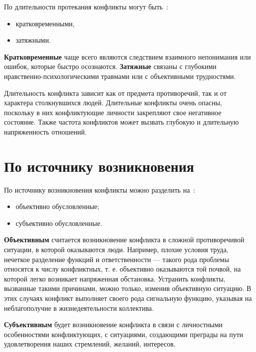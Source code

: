 По длительности протекания конфликты могут быть~\cite{book08}:
\begin{itemize}
    \item кратковременными,
    \item затяжными.
\end{itemize}

\textbf{Кратковременные} чаще всего являются следствием взаимного непонимания или ошибок,
которые быстро осознаются. \textbf{Затяжные} связаны с глубокими
нравственно-психологическими травмами или с объективными трудностями.

Длительность конфликта зависит как от предмета противоречий, так и от характера
столкнувшихся людей. Длительные конфликты очень опасны, поскольку в них
конфликтующие личности закрепляют свое негативное состояние. Также частота
конфликтов может вызвать глубокую и длительную напряженность отношений.

\section{По источнику возникновения}

По источнику возникновения конфликты можно разделить на~\cite{book08}:
\begin{itemize}
    \item объективно обусловленные;
    \item субъективно обусловленные.
\end{itemize}

\textbf{Объективным} считается возникновение конфликта в сложной противоречивой
ситуации, в которой оказываются люди. Например, плохие условия труда, нечеткое
разделение функций и ответственности --- такого рода проблемы относятся к числу
конфликтных, т. е. объективно оказываются той почвой, на которой легко возникает
напряженная обстановка. Устранить конфликты, вызванные такими причинами, можно
только, изменив объективную ситуацию. В этих случаях конфликт выполняет своего
рода сигнальную функцию, указывая на неблагополучие в жизнедеятельности
коллектива.

\textbf{Субъективным} будет возникновение конфликта в связи с личностными
особенностями конфликтующих, с ситуациями, создающими преграды на пути
удовлетворения наших стремлений, желаний, интересов.

